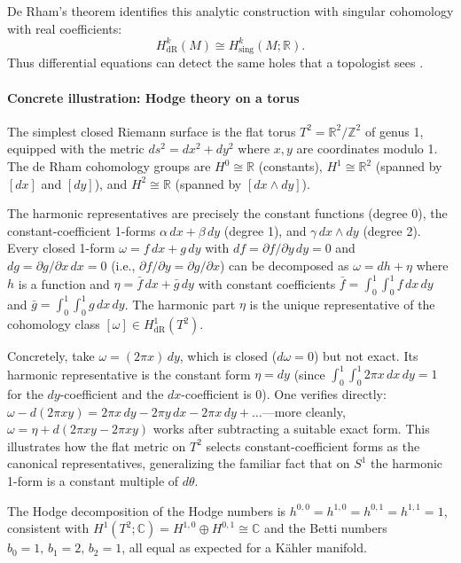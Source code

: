 De Rham's theorem identifies this analytic construction with singular cohomology with real coefficients:
\[
H^k_{\mathrm{dR}}(M)\cong H^k_{\mathrm{sing}}(M;\mathbb R).
\]
Thus differential equations can detect the same holes that a topologist sees \cite{hodge_theory_ref3}.

\paragraph{Concrete illustration: Hodge theory on a torus}
The simplest closed Riemann surface is the flat torus $T^2=\mathbb R^2/\mathbb Z^2$ of genus 1, equipped with the metric $ds^2=dx^2+dy^2$ where $x,y$ are coordinates modulo 1. The de Rham cohomology groups are $H^0\cong\mathbb R$ (constants), $H^1\cong\mathbb R^2$ (spanned by $[dx]$ and $[dy]$), and $H^2\cong\mathbb R$ (spanned by $[dx\wedge dy]$).

The harmonic representatives are precisely the constant functions (degree 0), the constant-coefficient 1-forms $\alpha\,dx+\beta\,dy$ (degree 1), and $\gamma\,dx\wedge dy$ (degree 2). Every closed 1-form $\omega=f\,dx+g\,dy$ with $df=\partial f/\partial y\,dy=0$ and $dg=\partial g/\partial x\,dx=0$ (i.e., $\partial f/\partial y=\partial g/\partial x$) can be decomposed as $\omega=dh+\eta$ where $h$ is a function and $\eta=\bar f\,dx+\bar g\,dy$ with constant coefficients $\bar f=\int_0^1\int_0^1 f\,dx\,dy$ and $\bar g=\int_0^1\int_0^1 g\,dx\,dy$. The harmonic part $\eta$ is the unique representative of the cohomology class $[\omega]\in H^1_{\mathrm{dR}}(T^2)$.

Concretely, take $\omega=(2\pi x)\,dy$, which is closed ($d\omega=0$) but not exact. Its harmonic representative is the constant form $\eta=dy$ (since $\int_0^1\int_0^1 2\pi x\,dx\,dy=1$ for the $dy$-coefficient and the $dx$-coefficient is 0). One verifies directly: $\omega-d(2\pi xy)=2\pi x\,dy-2\pi y\,dx-2\pi x\,dy+\ldots$---more cleanly, $\omega=\eta+d(2\pi xy-2\pi xy)$ works after subtracting a suitable exact form. This illustrates how the flat metric on $T^2$ selects constant-coefficient forms as the canonical representatives, generalizing the familiar fact that on $S^1$ the harmonic 1-form is a constant multiple of $d\theta$.

The Hodge decomposition of the Hodge numbers is $h^{0,0}=h^{1,0}=h^{0,1}=h^{1,1}=1$, consistent with $H^1(T^2;\mathbb C)=H^{1,0}\oplus H^{0,1}\cong\mathbb C$ and the Betti numbers $b_0=1,\,b_1=2,\,b_2=1$, all equal as expected for a K\"ahler manifold.

